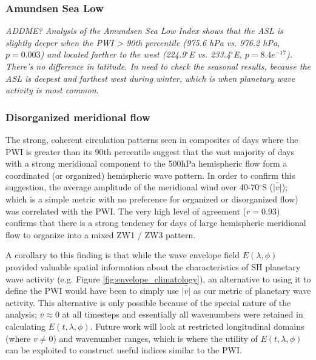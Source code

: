 \subsubsection{Amundsen Sea Low}

\textit{ADDME? Analysis of the Amundsen Sea Low Index \citep{Turner2013} shows that the ASL is slightly deeper when the PWI > 90th percentile (975.6 hPa vs. 976.2 hPa, $p = 0.003$) and located farther to the west (224.9$^{\circ}$E vs. 233.4$^{\circ}$E, $p = 8.4e^{-17}$). There's no difference in latitude.  In need to check the seasonal results, because the ASL is deepest and farthest west during winter, which is when planetary wave activity is most common.}  

\subsubsection{Disorganized meridional flow}

The strong, coherent circulation patterns seen in composites of days where the PWI is greater than its 90th percentile suggest that the vast majority of days with a strong meridional component to the 500hPa hemispheric flow form a coordinated (or organized) hemispheric wave pattern. In order to confirm this suggestion, the average amplitude of the meridional wind over 40-70$^{\circ}$S ($\bar{\lvert v \rvert}$); which is a simple metric with no preference for organized or disorganized flow) was correlated with the PWI. The very high level of agreement ($r = 0.93$) confirms that there is a strong tendency for days of large hemispheric meridional flow to organize into a mixed ZW1 / ZW3 pattern. 

A corollary to this finding is that while the wave envelope field $E(\lambda,\phi)$ provided valuable spatial information about the characteristics of SH planetary wave activity (e.g. Figure \ref{fig:envelope_climatology}), an alternative to using it to define the PWI would have been to simply use $\bar{|v|}$ as our metric of planetary wave activity. This alternative is only possible because of the special nature of the analysis; $\bar{v} \approx 0$ at all timesteps and essentially all wavenumbers were retained in calculating $E(t,\lambda,\phi)$. Future work will look at restricted longitudinal domains (where $v \neq 0$) and wavenumber ranges, which is where the utility of $E(t,\lambda,\phi)$ can be exploited to construct useful indices similar to the PWI. 
